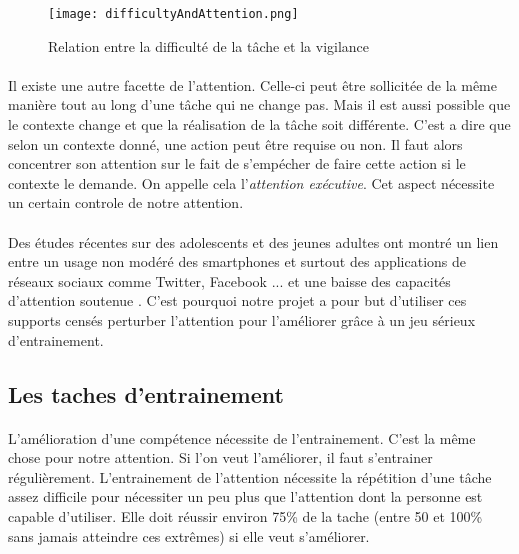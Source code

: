 \begin{figure}[H]
    \begin{center}
    \texttt{[image: difficultyAndAttention.png]}
    \end{center}
    \caption{Relation entre la difficulté de la tâche et la vigilance}
\label{DifficultyAndAttention}
\end{figure}

\paragraph{}Il existe une autre facette de l'attention. Celle-ci peut être sollicitée de la même manière tout au long d'une tâche qui ne change pas. Mais il est aussi possible que le
contexte change et que la réalisation de la tâche soit différente. C'est a dire que selon un contexte donné, une action peut être requise ou non. Il faut alors concentrer son
attention sur le fait de s'empécher de faire cette action si le contexte le demande. On appelle cela l'\emph{attention exécutive}. Cet aspect nécessite un certain controle de notre
attention.


\paragraph{}Des études récentes sur des adolescents et des jeunes adultes ont montré un lien entre un usage non modéré des smartphones et surtout des applications de réseaux sociaux
comme Twitter, Facebook ... et une baisse des capacités d'attention soutenue \cite{ART01}. C'est pourquoi notre projet a pour but d'utiliser ces supports censés perturber l'attention
pour l'améliorer grâce à un jeu sérieux d'entrainement.




\newpage
\subsection{Les taches d'entrainement}
\label{TrainingSection}

\paragraph{}L'amélioration d'une compétence nécessite de l'entrainement. C'est la même chose pour notre attention. Si l'on veut l'améliorer, il faut s'entrainer régulièrement.
L'entrainement de l'attention nécessite la répétition d'une tâche assez difficile pour nécessiter un peu plus que l'attention dont la personne est capable d'utiliser. Elle doit réussir
environ 75\% de la tache (entre 50 et 100\% sans jamais atteindre ces extrêmes) si elle veut s'améliorer.

